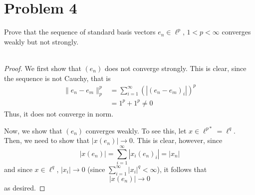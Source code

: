 \documentclass[fontsize=11pt]{scrartcl} %
\numberwithin{equation}{section} %
\numberwithin{figure}{section} %
\numberwithin{table}{section} %
\begin{document}
\newpage

\section*{Problem 4}
Prove that the sequence of standard basis vectors $e_n\in \ell^p$, $1<p<\infty$
converges weakly but not strongly.
\\
\\
\begin{proof}
    We first show that $(e_n)$ does not converge strongly. This is clear, since
    the sequence is not Cauchy, that is
    \[
        \begin{aligned}
            \|e_n-e_m\|^p_p &= \sum_{i=1}^{\infty}(|(e_n-e_m)_i|)^p\\
                            &= 1^p+1^p\neq 0
        \end{aligned}
    \]
    Thus, it does not converge in norm.

    Now, we show that $(e_n)$ converges weakly. To see this, let $x\in \ell^{p*}
    = \ell^q$. Then, we need to show that $|x(e_n)|\to 0$. This is clear,
    however, since
    \[
        |x(e_n)| = \sum_{i=1}^{\infty}|x_i(e_n)_i| = |x_n|
    \]
    and since $x\in\ell^q$, $|x_i|\to 0$ (since $\sum_{i=1}^{\infty}|x_i|^q <
    \infty$), it follows that
    \[
        |x(e_n)|\to 0
    \]
    as desired.
\end{proof}

\newpage
\end{document}
